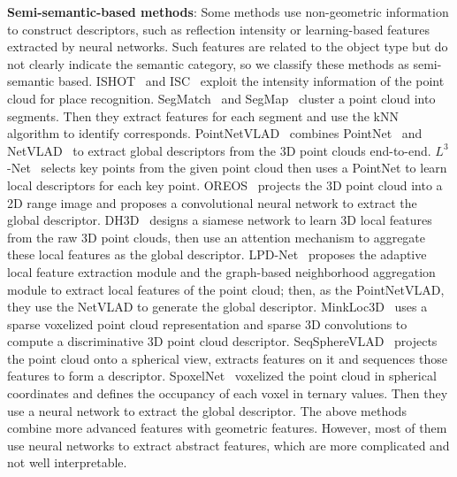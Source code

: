 \documentclass[letterpaper, 10 pt, conference]{ieeeconf}
\begin{document}
\textbf{Semi-semantic-based methods}: Some methods use non-geometric information to construct descriptors, such as reflection intensity or learning-based features extracted by neural networks. Such features are related to the object type but do not clearly indicate the semantic category, so we classify these methods as semi-semantic based. ISHOT~\cite{ISHOT} and ISC~\cite{ISC} exploit the intensity information of the point cloud for place recognition. SegMatch~\cite{segmatch} and SegMap~\cite{segmap2} cluster a point cloud into segments. Then they extract features for each segment and use the kNN algorithm to identify corresponds. PointNetVLAD~\cite{PV} combines PointNet~\cite{pointnet} and NetVLAD~\cite{netvlad} to extract global descriptors from the 3D point clouds end-to-end. \(L^3\)-Net~\cite{l3net} selects key points from the given point cloud then uses a PointNet to learn local descriptors for each key point. OREOS~\cite{oreos} projects the 3D point cloud into a 2D range image and proposes a convolutional neural network to extract the global descriptor. DH3D~\cite{dh3d} designs a siamese network to learn 3D local features from the raw 3D point clouds, then use an attention mechanism to aggregate these local features as the global descriptor. LPD-Net~\cite{lpdnet} proposes the adaptive local feature extraction module and the graph-based neighborhood aggregation module to extract local features of the point cloud; then, as the PointNetVLAD, they use the NetVLAD to generate the global descriptor. MinkLoc3D~\cite{minlock3d} uses a sparse voxelized point cloud representation and sparse 3D convolutions to compute a discriminative 3D point cloud descriptor. SeqSphereVLAD~\cite{SeqSphereVLAD} projects the point cloud onto a spherical view, extracts features on it and sequences those features to form a descriptor. SpoxelNet~\cite{spoxenet} voxelized the point cloud in spherical coordinates and defines the occupancy of each voxel in ternary values. Then they use a neural network to extract the global descriptor. The above methods combine more advanced features with geometric features. However, most of them use neural networks to extract abstract features, which are more complicated and not well interpretable.
\end{document}
